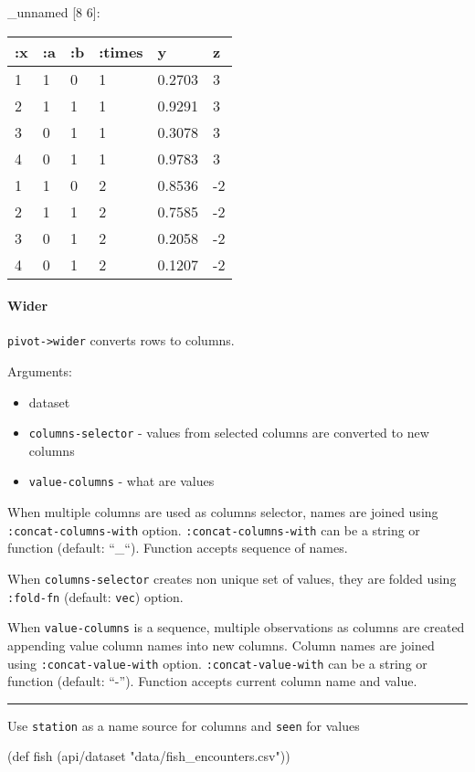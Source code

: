\documentclass[]{article}
\newenvironment{Shaded}{\begin{snugshade}}{\end{snugshade}}
\newcommand{\StringTok}[1]{\textcolor[rgb]{0.31,0.60,0.02}{#1}}
\newcommand{\FunctionTok}[1]{\textcolor[rgb]{0.00,0.00,0.00}{#1}}
\newcommand{\BuiltInTok}[1]{#1}
\newcommand{\NormalTok}[1]{#1}
\providecommand{\tightlist}{%
  \setlength{\itemsep}{0pt}\setlength{\parskip}{0pt}}
\let\oldparagraph\paragraph
\renewcommand{\paragraph}[1]{\oldparagraph{#1}\mbox{}}
\begin{document}
\_unnamed {[}8 6{]}:

\begin{longtable}[]{@{}llllll@{}}
\toprule
:x & :a & :b & :times & y & z\tabularnewline
\midrule
\endhead
1 & 1 & 0 & 1 & 0.2703 & 3\tabularnewline
2 & 1 & 1 & 1 & 0.9291 & 3\tabularnewline
3 & 0 & 1 & 1 & 0.3078 & 3\tabularnewline
4 & 0 & 1 & 1 & 0.9783 & 3\tabularnewline
1 & 1 & 0 & 2 & 0.8536 & -2\tabularnewline
2 & 1 & 1 & 2 & 0.7585 & -2\tabularnewline
3 & 0 & 1 & 2 & 0.2058 & -2\tabularnewline
4 & 0 & 1 & 2 & 0.1207 & -2\tabularnewline
\bottomrule
\end{longtable}

\paragraph{Wider}\label{wider}

\texttt{pivot-\textgreater{}wider} converts rows to columns.

Arguments:

\begin{itemize}
\tightlist
\item
  dataset
\item
  \texttt{columns-selector} - values from selected columns are converted
  to new columns
\item
  \texttt{value-columns} - what are values
\end{itemize}

When multiple columns are used as columns selector, names are joined
using \texttt{:concat-columns-with} option.
\texttt{:concat-columns-with} can be a string or function (default:
``\_``). Function accepts sequence of names.

When \texttt{columns-selector} creates non unique set of values, they
are folded using \texttt{:fold-fn} (default: \texttt{vec}) option.

When \texttt{value-columns} is a sequence, multiple observations as
columns are created appending value column names into new columns.
Column names are joined using \texttt{:concat-value-with} option.
\texttt{:concat-value-with} can be a string or function (default:
``-''). Function accepts current column name and value.

\begin{center}\rule{0.5\linewidth}{0.5pt}\end{center}

Use \texttt{station} as a name source for columns and \texttt{seen} for
values

\begin{Shaded}
\begin{Highlighting}[]
\NormalTok{(}\BuiltInTok{def}\FunctionTok{ fish }\NormalTok{(api/dataset }\StringTok{"data/fish_encounters.csv"}\NormalTok{))}
\end{Highlighting}
\end{Shaded}
\end{document}
